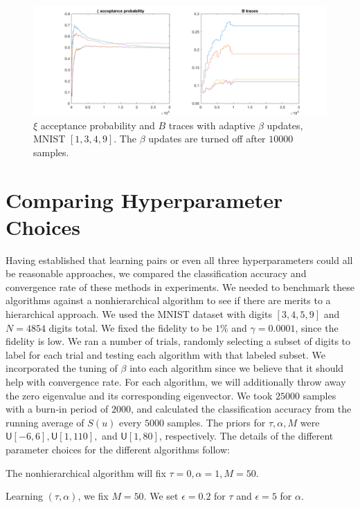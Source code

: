\documentclass{siamart1116}
\begin{document}
    \begin{figure}[!htb]
        \centering
        \caption{\label{adaptive_mnist_2}$\xi$ acceptance probability and $B$ traces with adaptive $\beta$ updates, MNIST $[1,3, 4, 9]$. The $\beta$ updates are turned off after $10000$ samples.}
        \includegraphics[width=0.8\linewidth]{adaptive_B/with/xi_B.png}
    \end{figure}

\section{Comparing Hyperparameter Choices}    
    Having established that learning pairs or even all three hyperparameters could all be reasonable approaches, we compared the classification accuracy and convergence rate of these methods in experiments. We needed to benchmark these algorithms against a nonhierarchical algorithm to see if there are merits to a hierarchical approach. We used the MNIST dataset with digits $[3,4,5,9]$ and $N=4854$ digits total. We fixed the fidelity to be $1\%$ and $\gamma = 0.0001$, since the fidelity is low. We ran a number of trials, randomly selecting a subset of digits to label for each trial and testing each algorithm with that labeled subset. We incorporated the tuning of $\beta$ into each algorithm since we believe that it should help with convergence rate. For each algorithm, we will additionally throw away the zero eigenvalue and its corresponding eigenvector. We took $25000$ samples with a burn-in period of $2000$, and calculated the classification accuracy from the running average of $S(u)$ every $5000$ samples. The priors for $\tau, \alpha, M$ were $\mathsf{U}[-6, 6], \mathsf{U}[1, 110],$ and $\mathsf{U}[1, 80]$, respectively. The details of the different parameter choices for the different algorithms follow:
    
    The nonhierarchical algorithm will fix $\tau=0, \alpha=1, M=50$.

    Learning $(\tau, \alpha)$, we fix $M=50$. We set $\epsilon=0.2$ for $\tau$ and $\epsilon = 5$ for $\alpha$.
\end{document}
